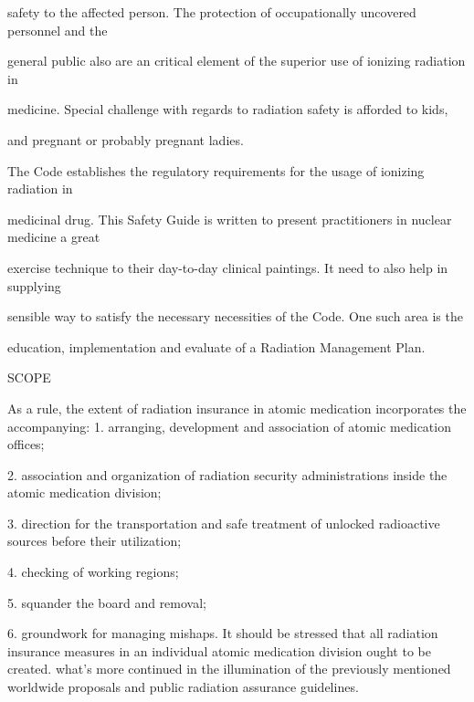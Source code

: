 \documentclass[
]{article}
\begin{document}
safety to the affected person. The protection of occupationally
uncovered personnel and the

general public also are an critical element of the superior use of
ionizing radiation in

medicine. Special challenge with regards to radiation safety is afforded
to kids,

and pregnant or probably pregnant ladies.

The Code establishes the regulatory requirements for the usage of
ionizing radiation in

medicinal drug. This Safety Guide is written to present practitioners in
nuclear medicine a great

exercise technique to their day-to-day clinical paintings. It need to
also help in supplying

sensible way to satisfy the necessary necessities of the Code. One such
area is the

education, implementation and evaluate of a Radiation Management Plan.

SCOPE

As a rule, the extent of radiation insurance in atomic medication
incorporates the accompanying: 1. arranging, development and association
of atomic medication offices;

2. association and organization of radiation security administrations
inside the atomic medication division;

3. direction for the transportation and safe treatment of unlocked
radioactive sources before their utilization;

4. checking of working regions;

5. squander the board and removal;

6. groundwork for managing mishaps. It should be stressed that all
radiation insurance measures in an individual atomic medication division
ought to be created. what's more continued in the illumination of the
previously mentioned worldwide proposals and public radiation assurance
guidelines.
\end{document}
